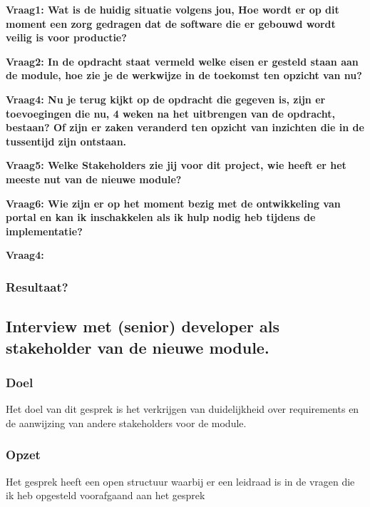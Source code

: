 \bigskip

\textbf{Vraag1: Wat is de huidig situatie volgens jou, Hoe wordt er op dit moment een zorg gedragen dat de software die er gebouwd wordt veilig is voor productie?}

\lipsum[01]
\bigskip

\textbf{Vraag2: In de opdracht staat vermeld welke eisen er gesteld staan aan de module, hoe zie je de werkwijze in de toekomst ten opzicht van nu?}

\lipsum[03]
\bigskip

\textbf{Vraag4: Nu je terug kijkt op de opdracht die gegeven is, zijn er toevoegingen die nu, 4 weken na het uitbrengen van de opdracht, bestaan? Of zijn er zaken veranderd ten opzicht van inzichten die in de tussentijd zijn ontstaan.}

\lipsum[05]
\bigskip

\textbf{Vraag5: Welke Stakeholders zie jij voor dit project, wie heeft er het meeste nut van de nieuwe module? }

\lipsum[06]
\bigskip

\textbf{Vraag6: Wie zijn er op het moment bezig met de ontwikkeling van portal en kan ik inschakkelen als ik hulp nodig heb tijdens de implementatie?}

\lipsum[09]
\bigskip

\textbf{Vraag4: }

\lipsum[07]

\subsubsection{Resultaat?}
\subsection{Interview met (senior) developer als stakeholder van de nieuwe module.}

\subsubsection{Doel}
Het doel van dit gesprek is het verkrijgen van duidelijkheid over requirements en de aanwijzing van andere stakeholders voor de module.

\subsubsection{Opzet}
Het gesprek heeft een open structuur waarbij er een leidraad is in de vragen die ik heb opgesteld voorafgaand aan het gesprek

